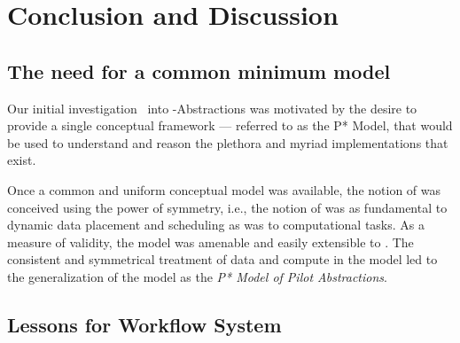 \documentclass{sig-alternate}
\begin{document}



\section{Conclusion and Discussion}



\subsection{The need for a common minimum model}


Our initial investigation~\cite{Luckow:2008la} into
\pilot-Abstractions was motivated by the desire to provide a single
conceptual framework --- referred to as the P* Model, that would be
used to understand and reason the plethora and myriad \pilotjob
implementations that exist.

 
Once a common and uniform conceptual model was available, the notion
of \pilotdata was conceived using the power of symmetry, i.e., the
notion of \pilotdata was as fundamental to dynamic data placement and
scheduling as \pilotjobs was to computational tasks. As a measure of
validity, the \pstar model was amenable and easily extensible to
\pilotdata.  The consistent and symmetrical treatment of data and
compute in the model led to the generalization of the model as the
{\it P* Model of Pilot Abstractions}.


\subsection{Lessons for Workflow System}
\end{document}
